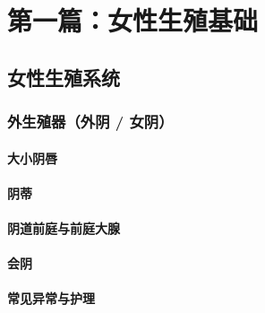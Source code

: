 %
%

\newif\ifskipfemaleframework
\skipfemaleframeworktrue   %

\ifskipfemaleframework
\else

\part{第一篇：女性生殖基础}

\chapter{女性生殖系统}

\section{外生殖器（外阴 / 女阴）}
\subsection{大小阴唇}
\subsection{阴蒂}
\subsection{阴道前庭与前庭大腺}
\subsection{会阴}
\subsection{常见异常与护理}

